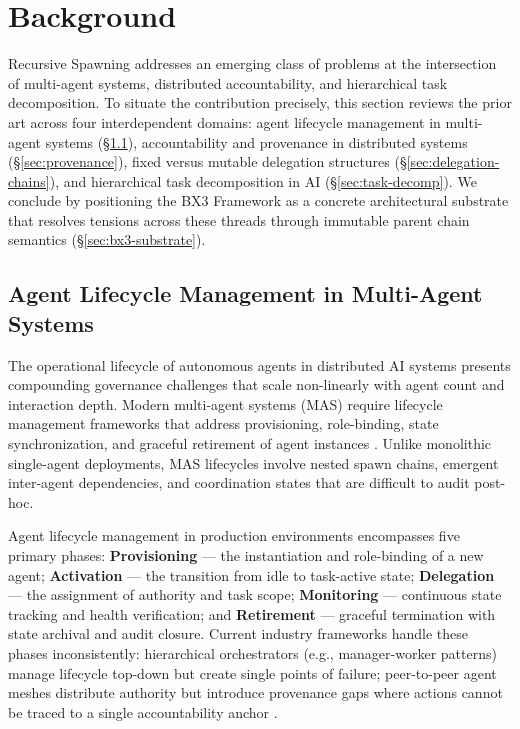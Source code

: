 \section{Background}

Recursive Spawning addresses an emerging class of problems at the intersection of multi-agent systems, distributed accountability, and hierarchical task decomposition. To situate the contribution precisely, this section reviews the prior art across four interdependent domains: agent lifecycle management in multi-agent systems (§\ref{sec:agent-lifecycle}), accountability and provenance in distributed systems (§\ref{sec:provenance}), fixed versus mutable delegation structures (§\ref{sec:delegation-chains}), and hierarchical task decomposition in AI (§\ref{sec:task-decomp}). We conclude by positioning the BX3 Framework as a concrete architectural substrate that resolves tensions across these threads through immutable parent chain semantics (§\ref{sec:bx3-substrate}).

\subsection{Agent Lifecycle Management in Multi-Agent Systems}
\label{sec:agent-lifecycle}

The operational lifecycle of autonomous agents in distributed AI systems presents compounding governance challenges that scale non-linearly with agent count and interaction depth. Modern multi-agent systems (MAS) require lifecycle management frameworks that address provisioning, role-binding, state synchronization, and graceful retirement of agent instances \cite{cenfic_production_2025, lumenova_govern_2025}. Unlike monolithic single-agent deployments, MAS lifecycles involve nested spawn chains, emergent inter-agent dependencies, and coordination states that are difficult to audit post-hoc.

Agent lifecycle management in production environments encompasses five primary phases: \textbf{Provisioning} — the instantiation and role-binding of a new agent; \textbf{Activation} — the transition from idle to task-active state; \textbf{Delegation} — the assignment of authority and task scope; \textbf{Monitoring} — continuous state tracking and health verification; and \textbf{Retirement} — graceful termination with state archival and audit closure. Current industry frameworks handle these phases inconsistently: hierarchical orchestrators (e.g., manager-worker patterns) manage lifecycle top-down but create single points of failure; peer-to-peer agent meshes distribute authority but introduce provenance gaps where actions cannot be traced to a single accountability anchor \cite{voltagent_papers_2026}.

